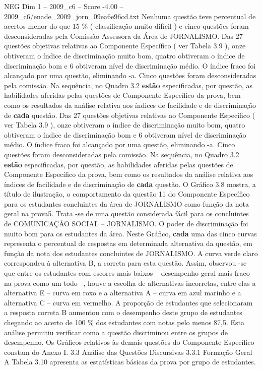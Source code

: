 \begin{textsample}{NEG Dim 1 – 2009\_c6 – Score -4.00 – 2009\_c6/enade\_2009\_jorn\_09ea6e96cd.txt}
Nenhuma questão teve percentual de acertos menor do que 15 \% ( classificação muito difícil ) e cinco questões foram desconsideradas pela Comissão Assessora da Área de JORNALISMO.
Das 27 questões objetivas relativas ao Componente Específico ( ver Tabela 3.9 ), onze obtiveram o índice de discriminação muito bom, quatro obtiveram o índice de discriminação bom e 6 obtiveram nível de discriminação médio.
O índice fraco foi alcançado por uma questão, eliminando -a.
Cinco questões foram desconsideradas pela comissão.
Na sequência, no Quadro 3.2 \textbf{estão} especificadas, por questão, as habilidades aferidas pelas questões de Componente Específico da prova, bem como os resultados da análise relativa aos índices de facilidade e de discriminação de \textbf{cada} questão.
Das 27 questões objetivas relativas ao Componente Específico ( ver Tabela 3.9 ), onze obtiveram o índice de discriminação muito bom, quatro obtiveram o índice de discriminação bom e 6 obtiveram nível de discriminação médio.
O índice fraco foi alcançado por uma questão, eliminando -a.
Cinco questões foram desconsideradas pela comissão.
Na sequência, no Quadro 3.2 \textbf{estão} especificadas, por questão, as habilidades aferidas pelas questões de Componente Específico da prova, bem como os resultados da análise relativa aos índices de facilidade e de discriminação de \textbf{cada} questão.
O Gráfico 3.8 mostra, a título de ilustração, o comportamento da questão 11 do Componente Específico para os estudantes concluintes da área de JORNALISMO como função da nota geral na prova5.
Trata -se de uma questão considerada fácil para os concluintes de COMUNICAÇÃO SOCIAL – JORNALISMO.
O poder de discriminação foi muito bom para os estudantes da área.
Neste Gráfico, \textbf{cada} uma das cinco curvas representa o percentual de respostas em determinada alternativa da questão, em função da nota dos estudantes concluintes de JORNALISMO.
A curva verde claro correspondeu à alternativa B, a correta para esta questão.
Assim, observou -se que entre os estudantes com escores mais baixos – desempenho geral mais fraco na prova como um todo –, houve a escolha de alternativas incorretas, entre elas a alternativa E – curva em roxo e a alternativa A – curva em azul marinho e a alternativa C – curva em vermelho.
A proporção de estudantes que selecionaram a resposta correta B aumentou com o desempenho deste grupo de estudantes chegando ao acerto de 100 \% dos estudantes com notas pelo menos 87,5.
Esta análise permitiu verificar como a questão discriminou entre os grupos de desempenho.
Os Gráficos relativos às demais questões do Componente Específico constam do Anexo I. 3.3 Análise das Questões Discursivas 3.3.1 Formação Geral A Tabela 3.10 apresenta as estatísticas básicas da prova por grupo de estudantes.

\end{textsample}
